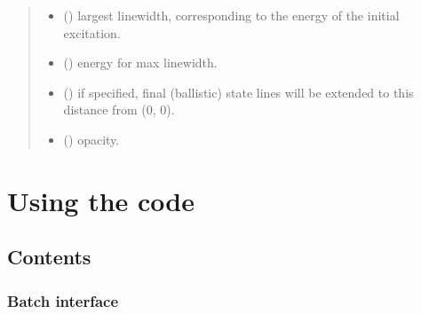 \documentclass[letterpaper,10pt,english]{sphinxmanual}
\begin{document}
\begin{fulllineitems}
\begin{quote}
\begin{description}
\begin{itemize}
\item {} 
 (\sphinxstyleliteralemphasis{\sphinxupquote{, }}) \textendash{} largest linewidth, corresponding
to the energy of the initial excitation.

\item {} 
 (\sphinxstyleliteralemphasis{\sphinxupquote{, }}) \textendash{} energy for max linewidth.

\item {} 
 (\sphinxstyleliteralemphasis{\sphinxupquote{, }}) \textendash{} if specified, final (ballistic)
state lines will be extended to this distance from (0, 0).

\item {} 
 (\sphinxstyleliteralemphasis{\sphinxupquote{, }}) \textendash{} opacity.

\end{itemize}

\end{description}\end{quote}

\end{fulllineitems}



\section{Using the code}
\label{\detokenize{using:using-the-code}}\label{\detokenize{using::doc}}

\subsection{Contents}
\label{\detokenize{using:contents}}

\subsubsection{Batch interface}
\label{\detokenize{interface:batch-interface}}\label{\detokenize{interface::doc}}
\end{document}
